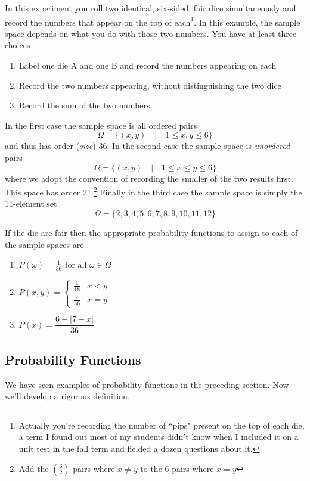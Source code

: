 \documentclass[../main.tex]{subfiles}
\begin{document}
\begin{example}
	In this experiment you roll two identical, six-sided, fair dice
	simultaneously and record the numbers that appear on the top of each\footnote{Actually you're recording the number of ``pips"
		present on the top of each die, a term I found out most
		of my students didn't know when I included it on
		a unit test in the fall term and fielded a dozen
		questions about it.}. In this example, the sample space
	depends on what you do with those two numbers. You have
	at least three choices
	\begin{enumerate}
		\item Label one die A and one B and record the numbers
		appearing on each
		\item Record the two numbers appearing, without distinguishing the two dice
		\item Record the sum of the two numbers
	\end{enumerate}

	In the first case the sample space is all ordered pairs
	$$\Omega = \{(x,y) \quad | \quad 1 \leq x,y \leq 6\}$$
	and thus has order (\textit{size}) 36. In the second case the
	sample space is \textit{unordered} pairs
	$$\Omega = \{(x,y) \quad | \quad 1 \leq x \leq y \leq 6\}$$
	where we adopt the convention of recording the smaller of the
	two results first. This space has order 21.\footnote{Add the
	${6 \choose 2}$ pairs where $x \neq y$ to the 6 pairs
	where $x=y$} Finally in the third case the sample
	space is simply the 11-element set
	$$\Omega = \{2,3,4,5,6,7,8,9,10,11,12\}$$
	
	If the die are fair then the appropriate probability functions
	to assign to each of the sample spaces are
	\begin{enumerate}
		\item $P(\omega)=\frac{1}{36}$ for all $\omega \in \Omega$
		\item $P(x,y)=
		\begin{cases}
			\frac{1}{18} & x<y\\
			 \frac{1}{36} & x=y
		\end{cases}$
		\item $P(x) = \dfrac{6-|7-x|}{36}$
	\end{enumerate}
	\end{example}

\subsection{Probability Functions}
We have seen examples of probability functions in the preceding section. Now we'll develop a rigorous definition. 
\end{document}
